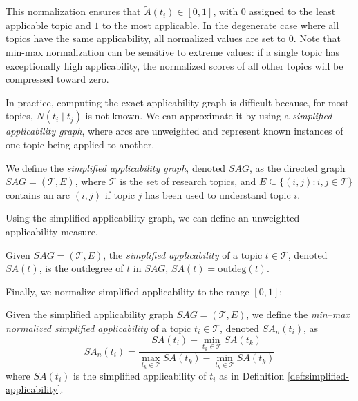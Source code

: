 This normalization ensures that $\tilde{A}(t_i) \in [0,1]$, with $0$ assigned to the least applicable topic and $1$ to the most applicable. In the degenerate case where all topics have the same applicability, all normalized values are set to 0. Note that min-max normalization can be sensitive to extreme values: if a single topic has exceptionally high applicability, the normalized scores of all other topics will be compressed toward zero.

In practice, computing the exact applicability graph is difficult because, for most topics, $N(t_i \mid t_j)$ is not known. We can approximate it by using a \emph{simplified applicability graph}, where arcs are unweighted and represent known instances of one topic being applied to another.

\begin{definition}
\label{def:simplified-applicability-graph}
We define the \emph{simplified applicability graph}, denoted $SAG$, as the directed graph $SAG = (\mathcal{T}, E)$,
where $\mathcal{T}$ is the set of research topics, and $E \subseteq \{ (i,j) : i,j \in \mathcal{T} \}$ contains an arc $(i,j)$ if topic $j$ has been used to understand topic $i$.
\end{definition}

Using the simplified applicability graph, we can define an unweighted applicability measure.

\begin{definition}
\label{def:simplified-applicability}
Given $SAG = (\mathcal{T}, E)$, the \emph{simplified applicability} of a topic $t \in \mathcal{T}$, denoted $SA(t)$, is the outdegree of $t$ in $SAG$, $SA(t) = \mathrm{outdeg}(t)$.
\end{definition}

Finally, we normalize simplified applicability to the range $[0,1]$:

\begin{definition}
\label{def:normalized-simplified-applicability}
Given the simplified applicability graph $SAG = (\mathcal{T}, E)$, we define the \emph{min–max normalized simplified applicability} of a topic $t_i \in \mathcal{T}$, denoted $SA_n(t_i)$, as
\[
SA_n(t_i) =
\frac{SA(t_i) - \min_{t_k \in \mathcal{T}} SA(t_k)}
     {\max_{t_k \in \mathcal{T}} SA(t_k) - \min_{t_k \in \mathcal{T}} SA(t_k)}
\]
where $SA(t_i)$ is the simplified applicability of $t_i$ as in Definition \ref{def:simplified-applicability}.
\end{definition}


